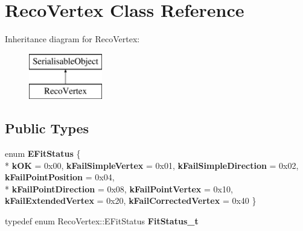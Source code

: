 \hypertarget{classRecoVertex}{\section{Reco\-Vertex Class Reference}
\label{classRecoVertex}
}
Inheritance diagram for Reco\-Vertex\-:\begin{figure}[H]
\begin{center}
\leavevmode
\includegraphics[height=2.000000cm]{classRecoVertex}
\end{center}
\end{figure}
\subsection*{Public Types}
\begin{DoxyCompactItemize}
\item 
enum {\bfseries E\-Fit\-Status} \{ \\*
{\bfseries k\-O\-K} = 0x00, 
{\bfseries k\-Fail\-Simple\-Vertex} = 0x01, 
{\bfseries k\-Fail\-Simple\-Direction} = 0x02, 
{\bfseries k\-Fail\-Point\-Position} = 0x04, 
\\*
{\bfseries k\-Fail\-Point\-Direction} = 0x08, 
{\bfseries k\-Fail\-Point\-Vertex} = 0x10, 
{\bfseries k\-Fail\-Extended\-Vertex} = 0x20, 
{\bfseries k\-Fail\-Corrected\-Vertex} = 0x40
 \}
\item 
\hypertarget{classRecoVertex_aa3fab4b6250c285ce2d82b3f80ceaf27}{typedef enum Reco\-Vertex\-::\-E\-Fit\-Status {\bfseries Fit\-Status\-\_\-t}}\label{classRecoVertex_aa3fab4b6250c285ce2d82b3f80ceaf27}

\end{DoxyCompactItemize}
